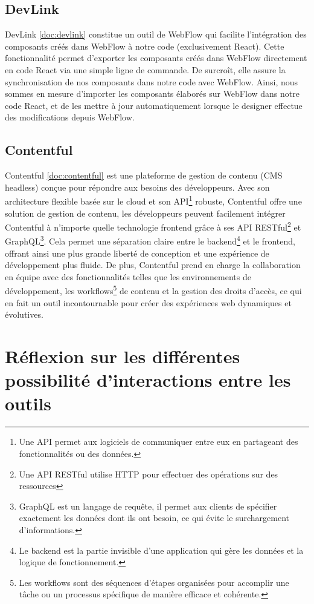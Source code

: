 \subsection{DevLink}
DevLink \ref{doc:devlink} constitue un outil de WebFlow qui facilite l'intégration des composants créés dans WebFlow à notre code (exclusivement React). Cette fonctionnalité permet d'exporter les composants créés dans WebFlow directement en code React via une simple ligne de commande. De surcroît, elle assure la synchronisation de nos composants dans notre code avec WebFlow. Ainsi, nous sommes en mesure d'importer les composants élaborés sur WebFlow dans notre code React, et de les mettre à jour automatiquement lorsque le designer effectue des modifications depuis WebFlow. 

\subsection{Contentful}
Contentful \ref{doc:contentful} est une plateforme de gestion de contenu (CMS headless) conçue pour répondre aux besoins des développeurs. Avec son architecture flexible basée sur le cloud et son API\footnote{Une API permet aux logiciels de communiquer entre eux en partageant des fonctionnalités ou des données.} robuste, Contentful offre une solution de gestion de contenu, les développeurs peuvent facilement intégrer Contentful à n'importe quelle technologie frontend grâce à ses API RESTful\footnote{Une API RESTful utilise HTTP pour effectuer des opérations sur des ressources} et GraphQL\footnote{GraphQL est un langage de requête, il permet aux clients de spécifier exactement les données dont ils ont besoin, ce qui évite le surchargement d'informations.}. Cela permet une séparation claire entre le backend\footnote{Le backend est la partie invisible d'une application qui gère les données et la logique de fonctionnement.} et le frontend, offrant ainsi une plus grande liberté de conception et une expérience de développement plus fluide. De plus, Contentful prend en charge la collaboration en équipe avec des fonctionnalités telles que les environnements de développement, les workflows\footnote{Les workflows sont des séquences d'étapes organisées pour accomplir une tâche ou un processus spécifique de manière efficace et cohérente.} de contenu et la gestion des droits d'accès, ce qui en fait un outil incontournable pour créer des expériences web dynamiques et évolutives.

\section{Réflexion sur les différentes possibilité d'interactions entre les outils}


